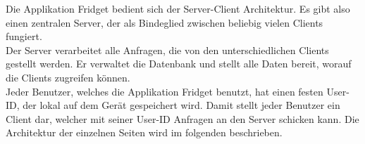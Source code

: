 Die Applikation Fridget bedient sich der Server-Client Architektur. Es gibt also einen zentralen Server, der als Bindeglied zwischen beliebig vielen Clients fungiert. \\
Der Server verarbeitet alle Anfragen, die von den unterschiedlichen Clients gestellt werden. Er verwaltet die Datenbank und stellt alle Daten bereit, worauf die Clients zugreifen können. \\
Jeder Benutzer, welches die Applikation Fridget benutzt, hat einen festen User-ID, der lokal auf dem Gerät gespeichert wird. Damit stellt jeder Benutzer ein Client dar, welcher mit seiner User-ID Anfragen an den Server schicken kann. 
Die Architektur der einzelnen Seiten wird im folgenden beschrieben. \\ 
